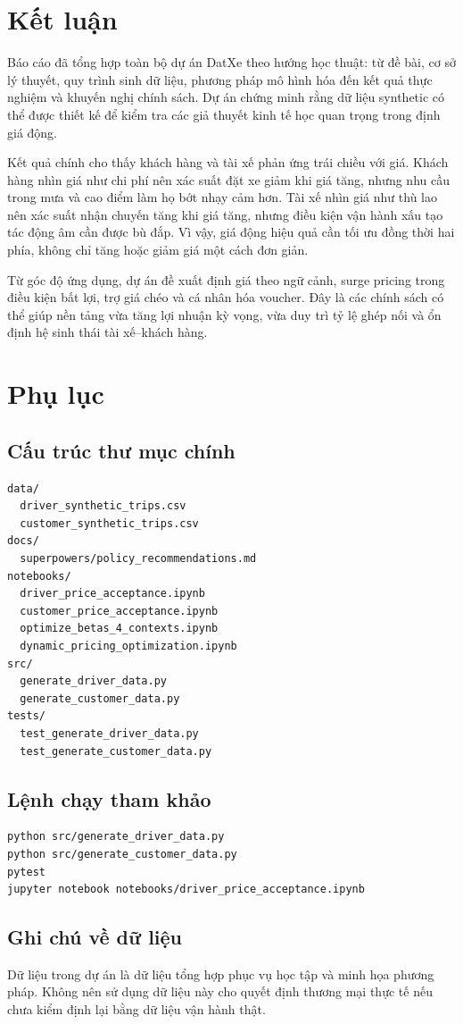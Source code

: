 \documentclass[12pt,a4paper]{report}
\begin{document}
\chapter{Kết luận}

Báo cáo đã tổng hợp toàn bộ dự án DatXe theo hướng học thuật: từ đề bài, cơ sở lý thuyết, quy trình sinh dữ liệu, phương pháp mô hình hóa đến kết quả thực nghiệm và khuyến nghị chính sách. Dự án chứng minh rằng dữ liệu synthetic có thể được thiết kế để kiểm tra các giả thuyết kinh tế học quan trọng trong định giá động.

Kết quả chính cho thấy khách hàng và tài xế phản ứng trái chiều với giá. Khách hàng nhìn giá như chi phí nên xác suất đặt xe giảm khi giá tăng, nhưng nhu cầu trong mưa và cao điểm làm họ bớt nhạy cảm hơn. Tài xế nhìn giá như thù lao nên xác suất nhận chuyến tăng khi giá tăng, nhưng điều kiện vận hành xấu tạo tác động âm cần được bù đắp. Vì vậy, giá động hiệu quả cần tối ưu đồng thời hai phía, không chỉ tăng hoặc giảm giá một cách đơn giản.

Từ góc độ ứng dụng, dự án đề xuất định giá theo ngữ cảnh, surge pricing trong điều kiện bất lợi, trợ giá chéo và cá nhân hóa voucher. Đây là các chính sách có thể giúp nền tảng vừa tăng lợi nhuận kỳ vọng, vừa duy trì tỷ lệ ghép nối và ổn định hệ sinh thái tài xế--khách hàng.

\appendix
\chapter{Phụ lục}

\section{Cấu trúc thư mục chính}

\begin{verbatim}
data/
  driver_synthetic_trips.csv
  customer_synthetic_trips.csv
docs/
  superpowers/policy_recommendations.md
notebooks/
  driver_price_acceptance.ipynb
  customer_price_acceptance.ipynb
  optimize_betas_4_contexts.ipynb
  dynamic_pricing_optimization.ipynb
src/
  generate_driver_data.py
  generate_customer_data.py
tests/
  test_generate_driver_data.py
  test_generate_customer_data.py
\end{verbatim}

\section{Lệnh chạy tham khảo}

\begin{verbatim}
python src/generate_driver_data.py
python src/generate_customer_data.py
pytest
jupyter notebook notebooks/driver_price_acceptance.ipynb
\end{verbatim}

\section{Ghi chú về dữ liệu}

Dữ liệu trong dự án là dữ liệu tổng hợp phục vụ học tập và minh họa phương pháp. Không nên sử dụng dữ liệu này cho quyết định thương mại thực tế nếu chưa kiểm định lại bằng dữ liệu vận hành thật.
\end{document}
